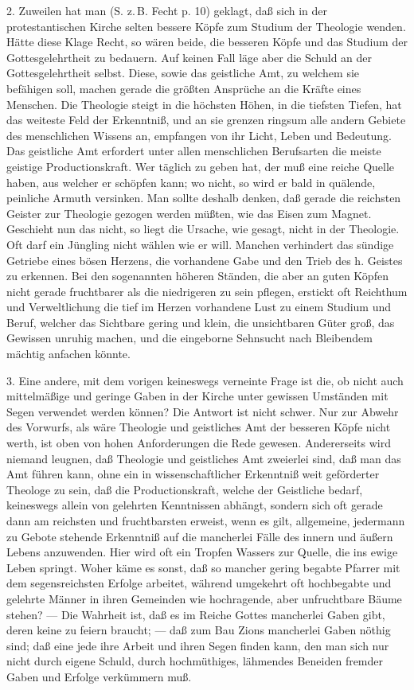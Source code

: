 2. Zuweilen hat man (S. z.\,B. Fecht p. 10) geklagt, daß sich in der protestantischen Kirche selten bessere Köpfe zum
Studium der Theologie wenden. Hätte diese Klage Recht, so wären beide, die besseren Köpfe und das Studium der Gottesgelehrtheit zu bedauern. Auf keinen Fall läge aber die Schuld an der Gottesgelehrtheit selbst. Diese, sowie das geistliche Amt, zu welchem sie befähigen soll, machen gerade die größten Ansprüche an die Kräfte eines Menschen. Die Theologie steigt in die höchsten Höhen, in die tiefsten Tiefen, hat das weiteste Feld der Erkenntniß, und an sie grenzen ringsum alle andern Gebiete des menschlichen Wissens an, empfangen von ihr Licht, Leben und Bedeutung. Das geistliche Amt erfordert unter allen menschlichen Berufsarten die meiste geistige Productionskraft. Wer täglich zu geben hat, der muß eine reiche Quelle haben, aus welcher er schöpfen kann; wo nicht, so wird er bald in quälende, peinliche Armuth versinken. Man sollte deshalb denken, daß gerade die reichsten Geister zur Theologie gezogen werden müßten, wie das Eisen zum Magnet. Geschieht nun das nicht, so liegt die Ursache, wie gesagt, nicht in der Theologie. Oft darf ein Jüngling nicht wählen wie er will. Manchen verhindert das sündige Getriebe eines bösen Herzens, die vorhandene Gabe und den Trieb des h. Geistes zu erkennen. Bei den sogenannten höheren Ständen, die aber an guten Köpfen nicht gerade fruchtbarer als die niedrigeren zu sein pflegen, erstickt oft Reichthum und Verweltlichung die tief im Herzen vorhandene Lust zu einem Studium und Beruf, welcher das Sichtbare gering und klein, die unsichtbaren Güter groß, das Gewissen unruhig machen, und die eingeborne Sehnsucht nach Bleibendem mächtig anfachen könnte.

3. Eine andere, mit dem vorigen keineswegs verneinte Frage ist die, ob nicht auch mittelmäßige und geringe Gaben in der Kirche unter gewissen Umständen mit Segen verwendet werden können? Die Antwort ist nicht schwer. Nur zur Abwehr des Vorwurfs, als wäre Theologie und geistliches Amt der besseren Köpfe nicht werth, ist oben von hohen Anforderungen die Rede gewesen. Andererseits wird niemand leugnen, daß Theologie und geistliches Amt zweierlei sind, daß man das Amt führen kann, ohne ein in wissenschaftlicher Erkenntniß weit geförderter Theologe zu sein, daß die Productionskraft, welche der Geistliche bedarf, keineswegs allein von gelehrten Kenntnissen abhängt, sondern sich oft gerade dann am reichsten und fruchtbarsten erweist, wenn es gilt, allgemeine, jedermann zu Gebote stehende Erkenntniß auf die mancherlei Fälle des innern und äußern Lebens anzuwenden. Hier wird oft ein Tropfen Wassers zur Quelle, die ins ewige Leben springt. Woher käme es sonst, daß so mancher gering begabte Pfarrer mit dem segensreichsten Erfolge arbeitet, während umgekehrt oft hochbegabte und gelehrte Männer in ihren Gemeinden wie hochragende, aber unfruchtbare Bäume stehen? — Die Wahrheit ist, daß es im Reiche Gottes mancherlei Gaben gibt, deren keine zu feiern braucht; — daß zum Bau Zions mancherlei Gaben nöthig sind; daß eine jede ihre Arbeit und ihren Segen finden kann, den man sich nur nicht durch eigene Schuld, durch hochmüthiges, lähmendes Beneiden fremder Gaben und Erfolge verkümmern muß.

